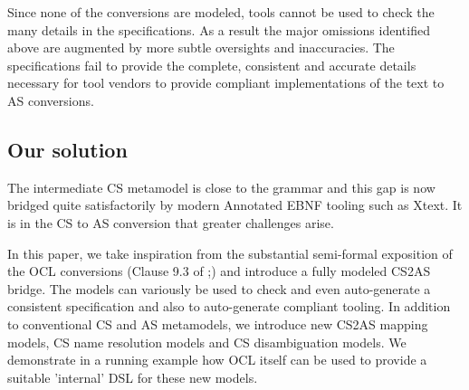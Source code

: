 \documentclass{llncs}
\begin{document}
Since none of the conversions are modeled, tools cannot be used to check the many details in the specifications. As a result the major omissions identified above are augmented by more subtle oversights and inaccuracies. The specifications fail to provide the complete, consistent and accurate details necessary for tool vendors to provide compliant implementations of the text to AS conversions. 


\subsection{Our solution}

The intermediate CS metamodel is close to the grammar and this gap is now bridged quite satisfactorily by modern Annotated EBNF tooling such as Xtext. It is in the CS to AS conversion that greater challenges arise. 

In this paper, we take inspiration from the substantial semi-formal exposition of the OCL conversions (Clause 9.3 of \cite{omg2013ocl};) and introduce a fully modeled CS2AS bridge. The models can variously be used to check and even auto-generate a consistent specification and also to auto-generate compliant tooling. In addition to conventional CS and AS metamodels, we introduce new CS2AS mapping models, CS name resolution models and CS disambiguation models. We demonstrate in a running example how OCL itself can be used to provide a suitable 'internal' DSL for these new models.


\end{document}
